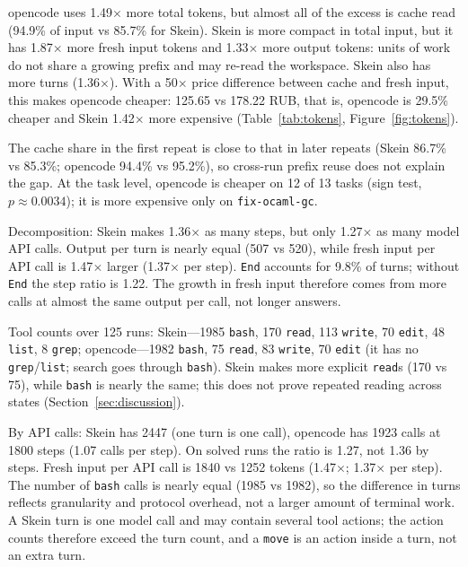 \documentclass[11pt,a4paper]{article}
\begin{document}
opencode uses 1.49$\times$ more total tokens, but almost all of the excess is cache read (94.9\%
of input vs 85.7\% for Skein). Skein is more compact in total input, but it has 1.87$\times$ more
fresh input tokens and 1.33$\times$ more output tokens: units of work do not share a growing
prefix and may re-read the workspace. Skein also has more turns (1.36$\times$). With a
50$\times$ price difference between cache and fresh input, this makes opencode cheaper: 125.65
vs 178.22 RUB, that is, opencode is 29.5\% cheaper and Skein 1.42$\times$ more expensive
(Table~\ref{tab:tokens}, Figure~\ref{fig:tokens}).

The cache share in the first repeat is close to that in later repeats (Skein 86.7\% vs 85.3\%;
opencode 94.4\% vs 95.2\%), so cross-run prefix reuse does not explain the gap. At the task
level, opencode is cheaper on 12 of 13 tasks (sign test, $p\approx0.0034$); it is more expensive
only on \texttt{fix-ocaml-gc}.

Decomposition: Skein makes 1.36$\times$ as many steps, but only 1.27$\times$ as many model API
calls. Output
per turn is nearly equal (507 vs 520), while fresh input per API call is 1.47$\times$ larger
(1.37$\times$ per step). \texttt{End} accounts for 9.8\% of turns; without \texttt{End} the step ratio is 1.22.
The growth in fresh input therefore comes from more calls at almost the same output per call, not
longer answers.

Tool counts over 125 runs: Skein---1985 \texttt{bash}, 170 \texttt{read}, 113 \texttt{write},
70 \texttt{edit}, 48 \texttt{list}, 8 \texttt{grep}; opencode---1982 \texttt{bash}, 75
\texttt{read}, 83 \texttt{write}, 70 \texttt{edit} (it has no \texttt{grep}/\texttt{list};
search goes through \texttt{bash}). Skein makes more explicit \texttt{read}s (170 vs 75), while
\texttt{bash} is nearly the same; this does not prove repeated reading across states
(Section~\ref{sec:discussion}).

By API calls: Skein has 2447 (one turn is one call), opencode has 1923 calls at 1800 steps (1.07
calls per step). On solved runs the ratio is 1.27, not 1.36 by steps. Fresh input per API call
is 1840 vs 1252 tokens (1.47$\times$; 1.37$\times$ per step). The number of \texttt{bash} calls
is nearly equal (1985 vs 1982), so the difference in turns reflects granularity and protocol overhead, not a
larger amount of terminal work. A Skein turn is one model call and may contain several tool actions; the
action counts therefore exceed the turn count, and a \texttt{move} is an action inside a turn, not an
extra turn.
\end{document}
